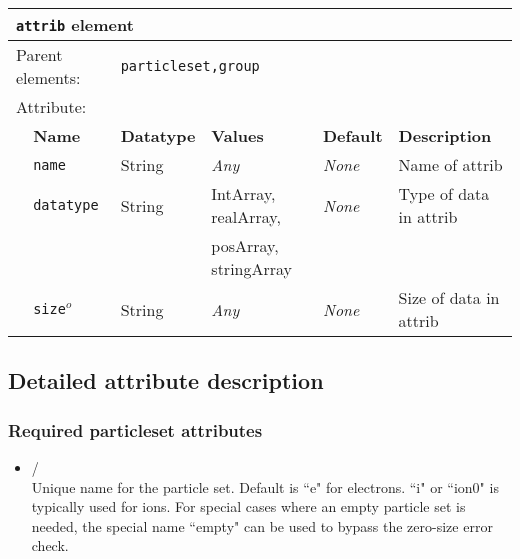 \begin{table}[h]
\begin{center}
\begin{tabularx}{\textwidth}{l l l l l X }
\hline
\multicolumn{6}{l}{\texttt{attrib} element} \\
\hline
\multicolumn{2}{l}{Parent elements:} & \multicolumn{4}{l}{\texttt{particleset,group}}\\
\multicolumn{2}{l}{Attribute:} & \multicolumn{4}{l}{}\\
   &   \bfseries Name            & \bfseries Datatype & \bfseries Values & \bfseries Default   & \bfseries Description \\
   &   \texttt{name}             &  String            &  \textit{Any}    &  \textit{None}    & Name of attrib              \\
   &   \texttt{datatype}         &  String            &  IntArray, realArray, &  \textit{None} & Type of data in attrib \\
   &                             &                    &  posArray, stringArray &             &                        \\
   &   \texttt{size}$^o$         &  String            &  \textit{Any}    &  \textit{None}    & Size of data in attrib \\
  \hline
  \hline
\end{tabularx}
\end{center}
\end{table}

\subsection{Detailed attribute description}

\subsubsection{Required particleset attributes}

\begin{itemize}
\item {}/ \\
Unique name for the particle set. Default is ``e" for electrons. ``i" or ``ion0" is typically used for ions. 
For special cases where an empty particle set is needed, the special name ``empty" can be used to bypass
the zero-size error check.
\end{itemize}

